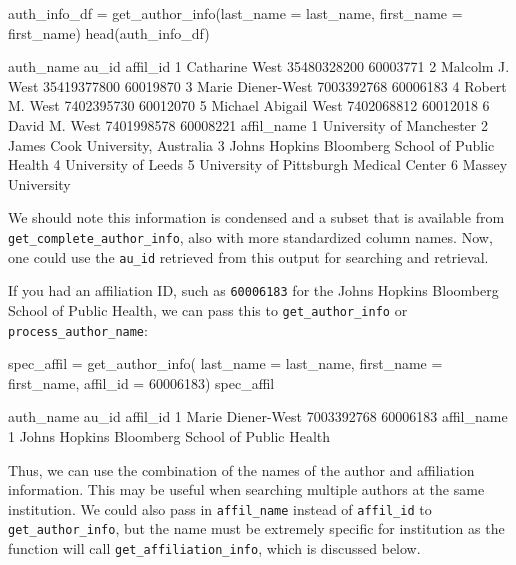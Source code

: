 \begin{Schunk}
\begin{Sinput}
auth_info_df = get_author_info(last_name = last_name, 
                              first_name = first_name)
head(auth_info_df)
\end{Sinput}
\begin{Soutput}
             auth_name       au_id affil_id
1       Catharine West 35480328200 60003771
2      Malcolm J. West 35419377800 60019870
3    Marie Diener-West  7003392768 60006183
4       Robert M. West  7402395730 60012070
5 Michael Abigail West  7402068812 60012018
6        David M. West  7401998578 60008221
                                       affil_name
1                        University of Manchester
2                James Cook University, Australia
3 Johns Hopkins Bloomberg School of Public Health
4                             University of Leeds
5         University of Pittsburgh Medical Center
6                               Massey University
\end{Soutput}
\end{Schunk}

We should note this information is condensed and a subset that is
available from \texttt{get\_complete\_author\_info}, also with more
standardized column names. Now, one could use the \texttt{au\_id}
retrieved from this output for searching and retrieval.

If you had an affiliation ID, such as \texttt{60006183} for the Johns
Hopkins Bloomberg School of Public Health, we can pass this to
\texttt{get\_author\_info} or \texttt{process\_author\_name}:

\begin{Schunk}
\begin{Sinput}
spec_affil = get_author_info(
  last_name = last_name, 
  first_name = first_name,
  affil_id = 60006183)
spec_affil
\end{Sinput}
\begin{Soutput}
          auth_name      au_id affil_id
1 Marie Diener-West 7003392768 60006183
                                       affil_name
1 Johns Hopkins Bloomberg School of Public Health
\end{Soutput}
\end{Schunk}

Thus, we can use the combination of the names of the author and
affiliation information. This may be useful when searching multiple
authors at the same institution. We could also pass in
\texttt{affil\_name} instead of \texttt{affil\_id} to
\texttt{get\_author\_info}, but the name must be extremely specific for
institution as the function will call \texttt{get\_affiliation\_info},
which is discussed below.

